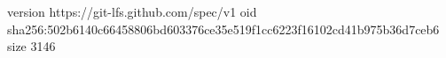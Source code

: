 version https://git-lfs.github.com/spec/v1
oid sha256:502b6140c66458806bd603376ce35e519f1cc6223f16102cd41b975b36d7ceb6
size 3146
